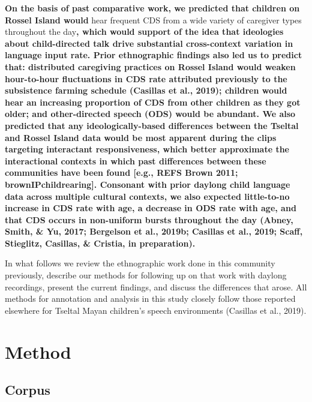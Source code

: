 \documentclass[,man,floatsintext]{apa6}
\begin{document}
\textbf{On the basis of past comparative work, we predicted that
children on Rossel Island would} hear frequent CDS from a wide variety
of caregiver types throughout the day\textbf{, which would support of
the idea that ideologies about child-directed talk drive substantial
cross-context variation in language input rate. Prior ethnographic
findings also led us to predict that: distributed caregiving practices
on Rossel Island would weaken hour-to-hour fluctuations in CDS rate
attributed previously to the subsistence farming schedule (Casillas et
al., 2019); children would hear an increasing proportion of CDS from
other children as they got older; and other-directed speech (ODS) would
be abundant. We also predicted that any ideologically-based differences
between the Tseltal and Rossel Island data would be most apparent during
the clips targeting interactant responsiveness, which better approximate
the interactional contexts in which past differences between these
communities have been found {[}e.g., REFS Brown 2011;
brownIPchildrearing{]}. Consonant with prior daylong child language data
across multiple cultural contexts, we also expected little-to-no
increase in CDS rate with age, a decrease in ODS rate with age, and that
CDS occurs in non-uniform bursts throughout the day (Abney, Smith, \&
Yu, 2017; Bergelson et al., 2019b; Casillas et al., 2019; Scaff,
Stieglitz, Casillas, \& Cristia, in preparation).}

In what follows we review the ethnographic work done in this community
previously, describe our methods for following up on that work with
daylong recordings, present the current findings, and discuss the
differences that arose. All methods for annotation and analysis in this
study closely follow those reported elsewhere for Tseltal Mayan
children's speech environments (Casillas et al., 2019).

\section{Method}\label{methods}

\subsection{Corpus}\label{methods-dataset}
\end{document}
